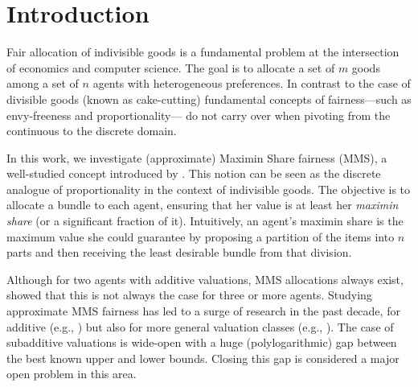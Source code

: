 \section{Introduction}
Fair allocation of indivisible goods is a fundamental problem at the
intersection of economics and computer science. The goal is to allocate
a set of $m$ goods among a set of $n$ agents with heterogeneous
preferences. In contrast to the case of divisible goods (known as
cake-cutting) fundamental concepts of fairness—such as envy-freeness and proportionality— do not carry over when pivoting from the
continuous to the discrete domain. 

In this work, we investigate (approximate) Maximin Share fairness (MMS), a
well-studied concept introduced by
\cite{BudishMMS}. This notion can be seen as the discrete analogue of
proportionality in the context of indivisible goods.  The objective is to
allocate a bundle to each agent, ensuring that her value is at
least her {\em maximin share} (or a significant fraction of
it). Intuitively, an agent's maximin share is the maximum value she
could guarantee by proposing a partition of the items into
$n$ parts and then receiving the least desirable bundle from that
division. 

Although for two agents with additive valuations, MMS allocations always exist, \cite{KurokawaProcacciaWang18} showed that this is not always the case for three or more agents.
Studying approximate MMS fairness has led to a surge of research in the past
decade, for additive (e.g., \cite{AmanatidisMNS17,GhodsiHSSY21,GargTaki21,AkramiGarg24}) but also for more general valuation classes (e.g., \cite{BarmanKrishnamurthy20,GhodsiHSSY22,SeddighinSeddighin24}). 
The case of subadditive valuations is wide-open with a huge (polylogarithmic) gap between the best known upper and lower bounds. Closing this gap is considered a major open problem in this area.


 

